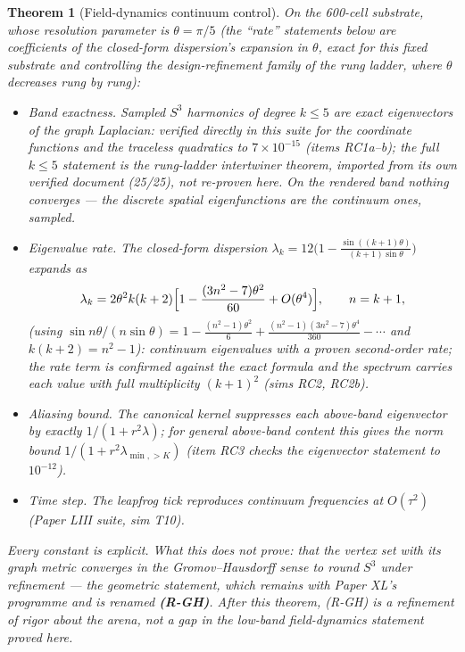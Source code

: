 \documentclass[12pt]{article}
\newtheorem{theorem}{Theorem}
\theoremstyle{definition}
\theoremstyle{remark}
\begin{document}
\begin{theorem}[Field-dynamics continuum control]\label{thm:rate}
On the 600-cell substrate, whose resolution parameter is $\theta = \pi/5$ (the ``rate'' statements below are coefficients of the closed-form dispersion's expansion in $\theta$, exact for this fixed substrate and controlling the design-refinement family of the rung ladder, where $\theta$ decreases rung by rung):
\begin{itemize}
\item[(i)] \emph{Band exactness.} Sampled $S^3$ harmonics of degree $k \le 5$ are \emph{exact} eigenvectors of the graph Laplacian: verified directly in this suite for the coordinate functions and the traceless quadratics to $7\times10^{-15}$ (items RC1a--b); the full $k \le 5$ statement is the rung-ladder intertwiner theorem, imported from its own verified document (25/25), not re-proven here. On the rendered band nothing converges --- the discrete spatial eigenfunctions are the continuum ones, sampled.
\item[(ii)] \emph{Eigenvalue rate.} The closed-form dispersion $\lambda_k = 12\bigl(1 - \frac{\sin((k+1)\theta)}{(k+1)\sin\theta}\bigr)$ expands as
$$\lambda_k = 2\theta^2 k(k+2)\Bigl[1 - \frac{(3n^2 - 7)\theta^2}{60} + O(\theta^4)\Bigr], \qquad n = k+1,$$
(using $\sin n\theta/(n\sin\theta) = 1 - \tfrac{(n^2-1)\theta^2}{6} + \tfrac{(n^2-1)(3n^2-7)\theta^4}{360} - \cdots$ and $k(k+2) = n^2-1$): continuum eigenvalues with a proven second-order rate; the rate term is confirmed against the exact formula and the spectrum carries each value with full multiplicity $(k+1)^2$ (sims RC2, RC2b).
\item[(iii)] \emph{Aliasing bound.} The canonical kernel suppresses each above-band eigenvector by exactly $1/(1 + r^2\lambda)$; for general above-band content this gives the norm bound $1/(1 + r^2\lambda_{\min,>K})$ (item RC3 checks the eigenvector statement to $10^{-12}$).
\item[(iv)] \emph{Time step.} The leapfrog tick reproduces continuum frequencies at $O(\tau^2)$ (Paper LIII suite, sim T10).
\end{itemize}
Every constant is explicit. What this does not prove: that the vertex set with its graph metric converges in the Gromov--Hausdorff sense to round $S^3$ under refinement --- the geometric statement, which remains with Paper XL's programme and is renamed \textbf{(R-GH)}. After this theorem, (R-GH) is a refinement of rigor about the arena, not a gap in the low-band field-dynamics statement proved here.
\end{theorem}
\end{document}
